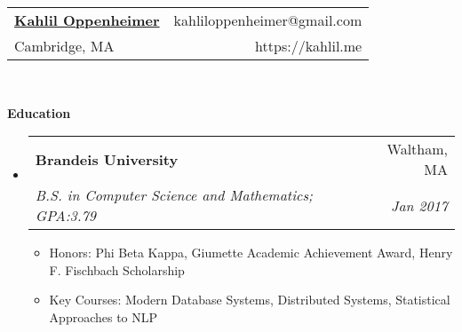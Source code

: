 \documentclass[letterpaper,11pt]{article}
\makeatletter
\newcommand{\resitem}[1]{\item #1 \vspace{-2pt}}
\newcommand{\resheading}[1]{{\large \colorbox{mygrey}{\begin{minipage}{\textwidth}{\textbf{#1 \vphantom{p\^{E}}}}\end{minipage}}}}
\newcommand{\ressubheading}[4]{
\begin{tabular*}{6.5in}{l@{\extracolsep{\fill}}r}
		\textbf{#1} & #2 \\
		\textit{#3} & \textit{#4} \\
\end{tabular*}\vspace{-6pt}}
\makeatother
\begin{document}
\newcommand{\mywebheader}{
	\begin{tabular*}{7in}{l@{\extracolsep{\fill}}r}
		\textbf{\LARGE \href{https://kahlil.me}{Kahlil Oppenheimer}} & {kahliloppenheimer@gmail.com} \\
		Cambridge, MA & https://kahlil.me
	\end{tabular*}
	\\
	\vspace{0.1in}}

\mywebheader

\resheading{Education}
\begin{itemize}
	\item
	      \ressubheading{Brandeis University}{Waltham, MA}{B.S. in Computer Science and Mathematics; GPA:3.79}{Jan 2017}
	      { \footnotesize
	      	\begin{itemize}
	      		\resitem{Honors: Phi Beta Kappa, Giumette Academic Achievement Award, Henry F. Fischbach Scholarship}
	      		\resitem{Key Courses: Modern Database Systems, Distributed Systems, Statistical Approaches to NLP}
	      	\end{itemize}
	      }
\end{itemize} %
\end{document}
